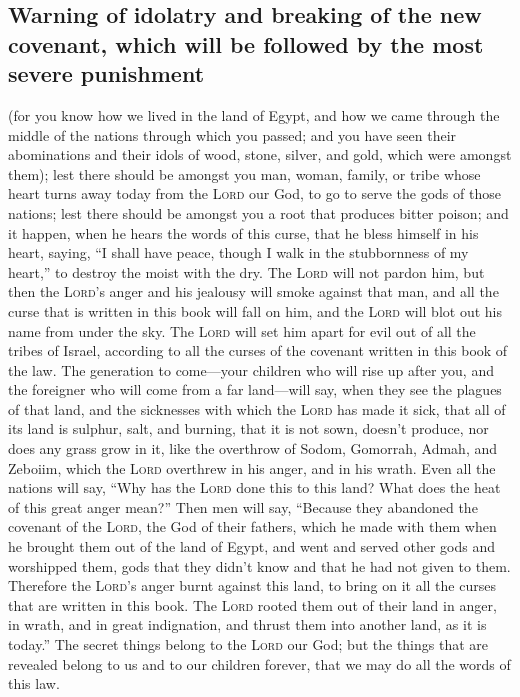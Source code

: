 \hypertarget{warning-of-idolatry-and-breaking-of-the-new-covenant-which-will-be-followed-by-the-most-severe-punishment}{%
\subsection{Warning of idolatry and breaking of the new covenant, which
will be followed by the most severe
punishment}\label{warning-of-idolatry-and-breaking-of-the-new-covenant-which-will-be-followed-by-the-most-severe-punishment}}

 (for you know how we lived in the land of Egypt, and how
we came through the middle of the nations through which you passed;
 and you have seen their abominations and their idols of
wood, stone, silver, and gold, which were amongst them); 
lest there should be amongst you man, woman, family, or tribe whose
heart turns away today from the \textsc{Lord} our God, to go to serve
the gods of those nations; lest there should be amongst you a root that
produces bitter poison;  and it happen, when he hears the
words of this curse, that he bless himself in his heart, saying, ``I
shall have peace, though I walk in the stubbornness of my heart,'' to
destroy the moist with the dry.  The \textsc{Lord} will
not pardon him, but then the \textsc{Lord}'s anger and his jealousy will
smoke against that man, and all the curse that is written in this book
will fall on him, and the \textsc{Lord} will blot out his name from
under the sky.  The \textsc{Lord} will set him apart for
evil out of all the tribes of Israel, according to all the curses of the
covenant written in this book of the law.  The generation
to come---your children who will rise up after you, and the foreigner
who will come from a far land---will say, when they see the plagues of
that land, and the sicknesses with which the \textsc{Lord} has made it
sick,  that all of its land is sulphur, salt, and
burning, that it is not sown, doesn't produce, nor does any grass grow
in it, like the overthrow of Sodom, Gomorrah, Admah, and Zeboiim, which
the \textsc{Lord} overthrew in his anger, and in his wrath.
 Even all the nations will say, ``Why has the
\textsc{Lord} done this to this land? What does the heat of this great
anger mean?''  Then men will say, ``Because they
abandoned the covenant of the \textsc{Lord}, the God of their fathers,
which he made with them when he brought them out of the land of Egypt,
 and went and served other gods and worshipped them, gods
that they didn't know and that he had not given to them. 
Therefore the \textsc{Lord}'s anger burnt against this land, to bring on
it all the curses that are written in this book.  The
\textsc{Lord} rooted them out of their land in anger, in wrath, and in
great indignation, and thrust them into another land, as it is today.''
 The secret things belong to the \textsc{Lord} our God;
but the things that are revealed belong to us and to our children
forever, that we may do all the words of this law.

